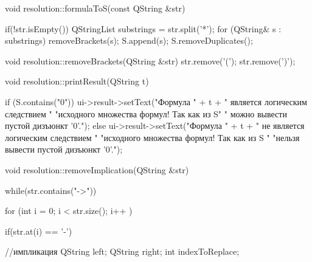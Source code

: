 \documentclass[12pt, a4paper]{article}
\begin{document}
\begin{cppcode}[caption = Файл Resolution.cpp]
	  	void resolution::formulaToS(const QString &str)
	  	{
	  		if(!str.isEmpty()){
	  			QStringList substrings = str.split('*');
	  			for (QString& s : substrings) {
	  				removeBrackets(s);
	  				S.append(s);
	  			}
	  			S.removeDuplicates();
	  		}
	  		
	  	}
	  	
	  	void resolution::removeBrackets(QString &str)
	  	{
	  		str.remove('(');
	  		str.remove(')');
	  	}
	  	
	  	
	  	void resolution::printResult(QString t)
	  	{
	  		
	  		if (S.contains("0")){
	  			ui->result->setText("Формула " + t + " является логическим следствием "
	  			"исходного множества формул! Так как из S"
	  			" можно вывести пустой дизъюнкт '0'.");
	  		}
	  		else{
	  			ui->result->setText("Формула " + t + " не является логическим следствием "
	  			"исходного множества формул! Так как из S "
	  			"нельзя вывести пустой дизъюнкт '0'.");
	  		}
	  	}
	  	
	  	void resolution::removeImplication(QString &str)
	  	{
	  		while(str.contains("->")){
	  			for (int i = 0; i < str.size(); i++ ) {
	  				if(str.at(i) == '-'){//импликация
	  					QString left;
	  					QString right;
	  					int indexToReplace;
	  					
}}}}
\end{cppcode}
\end{document}
